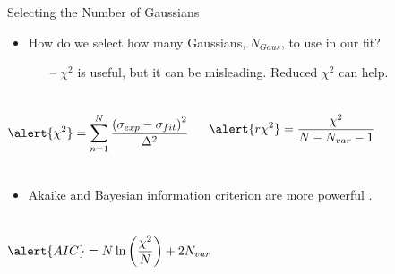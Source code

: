 \documentclass[10pt]{beamer}
\begin{document}
\begin{frame}[fragile]{Selecting the Number of Gaussians}

	\begin{itemize}
		\item How do we select \alert{how many Gaussians}, $N_{Gaus}$, to use in our fit?
		\begin{itemize}
			\pause
			\item[--]  \alert{$\chi^2$} is useful, but it can be misleading.  \alert{Reduced $\chi^2$} can help.
		\end{itemize}
	\end{itemize}
	
	\begin{columns}[T,onlytextwidth]  
	
	\vspace{-4.65mm}
	\begin{equation} \label{eq:chi2}
		\alert{\chi^2} = \sum_{n=1}^N \frac{\left( \sigma_{exp}-\sigma_{fit} \right)^2}{\Delta^2}
	\end{equation}
	
	
	\begin{equation} \label{eq:rchi2}
		\alert{r\chi^2} = \frac{\chi^2}{N-N_{var}-1}
	\end{equation}
	
	\end{columns}
	
	\begin{itemize}
		\pause
		\item {} \alert{Akaike} and \alert{Bayesian} information criterion are more powerful \cite{doug_stats}.
	\end{itemize}
	
	\begin{columns}[T,onlytextwidth]  
	
	\begin{equation} \label{eq:AIC}
		\alert{AIC} = N \ln\left( \frac{\chi^2}{N} \right) + 2 N_{var}
	\end{equation}

	

\end{columns}
\end{frame}
\end{document}

